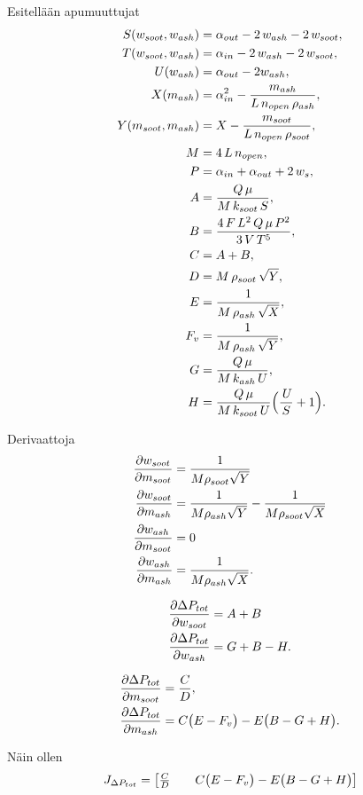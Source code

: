 Esitellään apumuuttujat
\begin{align*}
S(w_{{soot}}, w_{{ash}}) &=\alpha_{{out}}-2\,w_{{ash}}-2\,w_{{soot}},\\
T(w_{{soot}}, w_{{ash}}) &=\alpha_{{in}}-2\,w_{{ash}}-2\,w_{{soot}},\\
U(w_{ash}) &=  \alpha_{out} - 2w_{ash}, \\
X(m_{{ash}})            &=\alpha_{{in}}^2 -\frac{m_{{ash}}}{L\,n_{{open}}\,\rho_{{ash}}},\\
Y(m_{{soot}}, m_{{ash}}) &=X-\frac{m_{{soot}}}{L\,n_{{open}}\,\rho_{{soot}}},\\ 
M &=4\,L\,n_{{open}},\\
P &=\alpha_{{in}}+\alpha_{{out}}+2\,w_s,\\
A &=\frac{Q\,\mu}{M\,k_{{soot}}\,S},\\
B &= \frac{4\,F\,L^2\,Q\,\mu\,P^2}{3\,V\,T^5},\\
C &= A + B,\\
D &=M\,\rho_{{soot}}\,\sqrt{Y},\\
E &=\frac{1}{M\,\rho_{{ash}}\,\sqrt{X}},\\
F_v &= \frac{1}{M\,\rho_{{ash}}\,\sqrt{Y}},\\
G &=\frac{Q\,\mu}{M\,k_{ash}\,U},\\
H &=\frac{Q\,\mu}{M\,k_{soot}\,U}
      \Bigl(\frac{\,U}{S}+1\Bigr).
\end{align*}

Derivaattoja
\begin{align}
    \frac{\partial w_{soot}}{\partial m_{soot}} &= \frac{1}{M \rho_{soot}\sqrt{Y}} \\
    \frac{\partial w_{soot}}{\partial m_{ash}} &= \frac{1}{M\rho_{ash}\sqrt{Y}} - \frac{1}{M\rho_{soot}\sqrt{X}} \\
    \frac{\partial w_{ash}}{\partial m_{soot}}&=0\\
    \frac{\partial w_{ash}}{\partial m_{ash}} &= \frac{1}{M \rho_{ash}\sqrt{X}}.
\end{align}

\begin{align}
    \frac{\partial \Delta P_{tot}}{\partial w_{soot}} &= A+B\\
    \frac{\partial \Delta P_{tot}}{\partial w_{ash}} &= G+B-H.
\end{align}


\begin{align}
        \frac{\partial \Delta P_{tot}}{\partial m_{soot}} &=\frac{C}{D},
        \\
        \frac{\partial \Delta P_{tot}}{\partial m_{ash}} &=
        C\bigl(E - F_v\bigr)-E\bigl(B - G + H\bigr).
\end{align}

Näin ollen 
\begin{align}
    J_{\Delta P_{tot}} = \begin{bmatrix} \frac{C}{D} & \quad C\bigl(E - F_v\bigr)-E\bigl(B - G + H\bigr) \end{bmatrix}
\end{align}